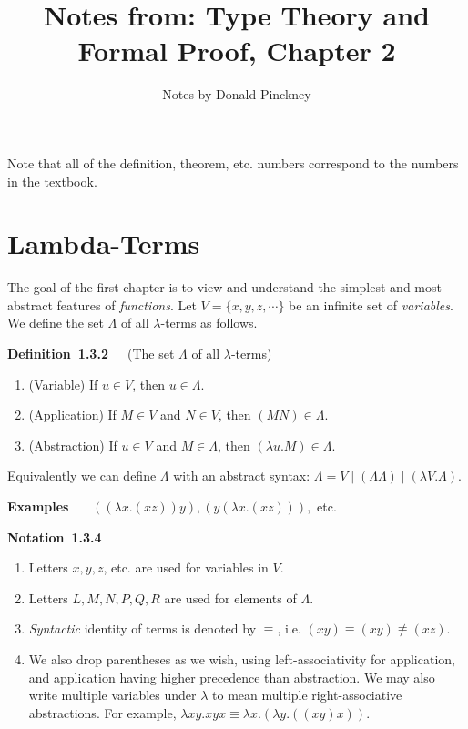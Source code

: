 \documentclass[letterpaper]{article}
\author{Notes by Donald Pinckney}
\title{Notes from: Type Theory and Formal Proof, Chapter 2}
\newenvironment{notation}[2][]{\par\medskip
	\noindent \textbf{Notation~#2}~~~#1 \rmfamily\em}{\medskip}
\newenvironment{examplesNonNum}[1][]{\par\medskip
	\noindent \textbf{Examples}~~~#1 \rmfamily}{\medskip}
\newenvironment{definition}[2][]{\par\medskip
	\noindent \textbf{Definition~#2}~~~#1 \rmfamily}{\medskip}
\begin{document}
\maketitle

Note that all of the definition, theorem, etc. numbers correspond to the numbers in the textbook.

\section{Lambda-Terms}

The goal of the first chapter is to view and understand the simplest and most abstract features of \emph{functions}. Let $V = \{x, y, z, \cdots\}$ be an infinite set of \emph{variables}. We define the set $\Lambda$ of all $\lambda$-terms as follows.

\begin{definition}[(The set $\Lambda$ of all $\lambda$-terms)]{1.3.2}
	\begin{enumerate}
		\item (Variable) If $u \in V$, then $u \in \Lambda$.
		\item (Application) If $M \in V$ and $N \in V$, then $(M N) \in \Lambda$.
		\item (Abstraction) If $u \in V$ and $M \in \Lambda$, then $(\lambda u.M) \in \Lambda$.
	\end{enumerate}
	Equivalently we can define $\Lambda$ with an abstract syntax: $\Lambda = V \mid (\Lambda \Lambda) \mid (\lambda V . \Lambda)$.
\end{definition}

\begin{examplesNonNum}
	$((\lambda x.(x z)) y), (y(\lambda x.(x z))), $ etc.
\end{examplesNonNum}

\begin{notation}{1.3.4}
	\begin{enumerate}
		\item Letters $x, y, z$, etc. are used for variables in $V$.
		\item Letters $L, M, N, P, Q, R$ are used for elements of $\Lambda$.
		\item \emph{Syntactic} identity of terms is denoted by $\equiv$, i.e. $(x y) \equiv (x y) \not \equiv (x z)$.
		\item We also drop parentheses as we wish, using left-associativity for application, and application having higher precedence than abstraction. We may also write multiple variables under $\lambda$ to mean multiple right-associative abstractions. For example, $\lambda xy.x y x \equiv \lambda x . (\lambda y. ((x y) x))$.
	\end{enumerate}
\end{notation}
\end{document}
